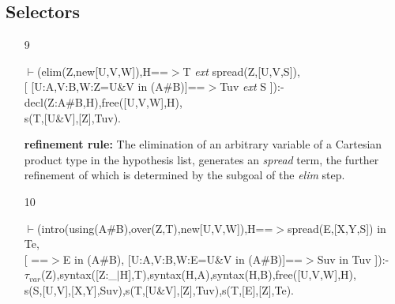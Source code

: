 \documentclass[11pt]{report}
\begin{document}
 \subsection{Selectors}
 \begin{enumerate} 
 \item[9]
\begin{sf}\begin{tabbing}
$\vdash$(elim(Z,new[U,V,W]),H==$>$T \mbox{\it ext} spread(Z,[U,V,S]),\\[-0.15ex]
\hspace{2em}[ [U:A,V:B,W:Z=U\&V in (A\#B)]==$>$Tuv \mbox{\it ext} S ]):-\\[-0.15ex]
\hspace{2em}decl(Z:A\#B,H),free([U,V,W],H),\\[-0.15ex]
\hspace{2em}s(T,[U\&V],[Z],Tuv).
\end{tabbing}\end{sf}

 {\bf refinement rule:}
 The elimination of an arbitrary variable of a Cartesian product
 type in the hypothesis list, generates an \emph{spread} term, the 
 further refinement of which is determined by the subgoal
 of the \emph{elim} step.
  
 \item[10]
\begin{sf}\begin{tabbing}
$\vdash$(intro(using(A\#B),over(Z,T),new[U,V,W]),H==$>$spread(E,[X,Y,S]) in Te,\\[-0.15ex]
\hspace{2em}[ ==$>$E in (A\#B), [U:A,V:B,W:E=U\&V in (A\#B)]==$>$Suv in Tuv ]):-\\[-0.15ex]
\hspace{2em}$\tau_{var}$(Z),syntax([Z:\_\hspace{0.1em}$\mid$H],T),syntax(H,A),syntax(H,B),free([U,V,W],H),\\[-0.15ex]
\hspace{2em}s(S,[U,V],[X,Y],Suv),s(T,[U\&V],[Z],Tuv),s(T,[E],[Z],Te).
\end{tabbing}\end{sf}


\end{enumerate}
\end{document}

